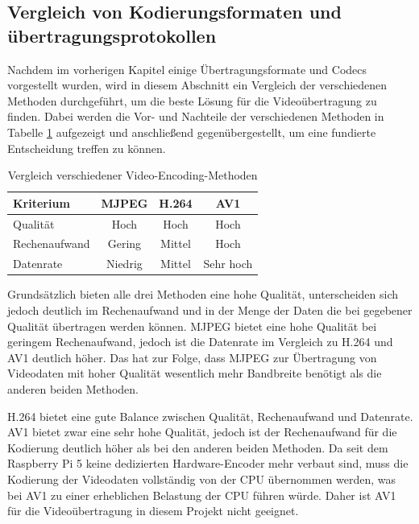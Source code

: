     \subsection{Vergleich von Kodierungsformaten und übertragungsprotokollen} \label{sec:video_encoding_comparison}
    Nachdem im vorherigen Kapitel einige Übertragungsformate und Codecs vorgestellt wurden, wird in diesem Abschnitt ein Vergleich der verschiedenen Methoden durchgeführt, um die beste Lösung für die Videoübertragung zu finden. Dabei werden die Vor- und Nachteile der verschiedenen Methoden in Tabelle \ref{tab:video_encoding_comparison} aufgezeigt und anschließend gegenübergestellt, um eine fundierte Entscheidung treffen zu können.
    \begin{table}[H]
        \centering
        \begin{tabular}{|l|c|c|c|}
            \hline
            \textbf{Kriterium} & \textbf{MJPEG} & \textbf{H.264} & \textbf{\ac{AV1}} \\
            \hline
            Qualität & Hoch & Hoch & Hoch \\
            \hline
            Rechenaufwand & Gering & Mittel & Hoch \\
            \hline
            Datenrate & Niedrig & Mittel & Sehr hoch \\
            \hline
        \end{tabular}
        \caption{Vergleich verschiedener Video-Encoding-Methoden}
        \label{tab:video_encoding_comparison}
    \end{table}

    Grundsätzlich bieten alle drei Methoden eine hohe Qualität, unterscheiden sich jedoch deutlich im Rechenaufwand und in der Menge der Daten die bei gegebener Qualität übertragen werden können. MJPEG bietet eine hohe Qualität bei geringem Rechenaufwand, jedoch ist die Datenrate im Vergleich zu H.264 und \ac{AV1} deutlich höher. Das hat zur Folge, dass MJPEG zur Übertragung von Videodaten mit hoher Qualität wesentlich mehr Bandbreite benötigt als die anderen beiden Methoden. 
    
    H.264 bietet eine gute Balance zwischen Qualität, Rechenaufwand und Datenrate. \ac{AV1} bietet zwar eine sehr hohe Qualität, jedoch ist der Rechenaufwand für die Kodierung deutlich höher als bei den anderen beiden Methoden. Da seit dem Raspberry Pi 5 keine dedizierten Hardware-Encoder mehr verbaut sind, muss die Kodierung der Videodaten vollständig von der \ac{CPU} übernommen werden, was bei \ac{AV1} zu einer erheblichen Belastung der \ac{CPU} führen würde. Daher ist \ac{AV1} für die Videoübertragung in diesem Projekt nicht geeignet.
    
